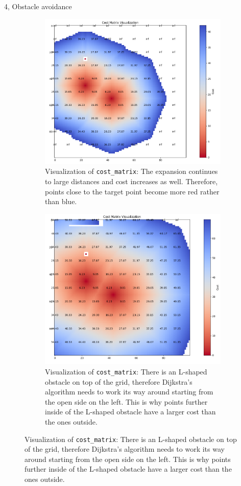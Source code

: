 \documentclass[10pt,a4paper]{article}
\begin{document}
\begin{task}{4, Obstacle avoidance}
\begin{figure}[H]
\begin{center}
\begin{subfigure}{0.65\textwidth}
 \centering
 \includegraphics[width=1\textwidth]{images/task4_dij_2d_expanding2.png}
 \caption{Visualization of \texttt{cost\_matrix}: The expansion continues to large distances and cost increases as well. Therefore, points close to the target point become more red rather than blue.}
 \end{subfigure}




\begin{subfigure}{0.65\textwidth}
 \centering
 \includegraphics[width=1\textwidth]{images/task4_dij_2d_expanding3.png}
 \caption{Visualization of \texttt{cost\_matrix}: There is an L-shaped obstacle on top of the grid, therefore Dijkstra's algorithm needs to work its way around starting from the open side on the left. This is why points further inside of the L-shaped obstacle have a larger cost than the ones outside.   }
 \end{subfigure}
\end{center}


\end{figure}
\end{task}
\end{document}
